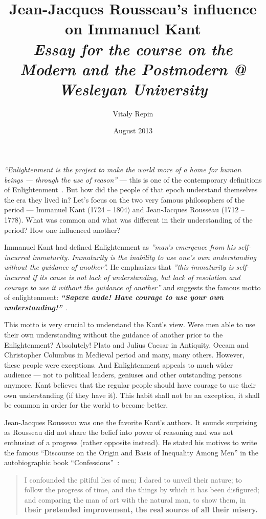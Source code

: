\documentclass{article}
\title{Jean-Jacques Rousseau's influence on Immanuel Kant\\ \textit{\small Essay for the course on the Modern and the Postmodern @ Wesleyan University}}
\author{Vitaly Repin}
\date{August 2013}
\begin{document}
\maketitle

\textit{``Enlightenment is the project to make the world more of a home for human beings --- through the use of reason''} --- this is one of the contemporary definitions of
Enlightenment~\cite{Roth}.
But how did the  people of that epoch understand themselves the era they lived in? Let's focus on the two very famous philosophers of the period --- Immanuel Kant (1724 -- 1804) and
Jean-Jacques Rousseau (1712 -- 1778). What was common and what was different in their understanding of the period? How one influenced another?


Immanuel Kant had defined Enlightenment as \textit{''man's emergence from his self-incurred immaturity. Immaturity is the inability to use one's own understanding without the guidance
of another''.} He emphasizes that \textit{''this immaturity is self-incurred if its cause is not lack of understanding, but lack of resolution and courage to use it without the guidance of another''}
and suggests the famous motto of enlightenment: \textbf{\textit{``Sapere aude! Have courage to use your own understanding!''}}~\cite{Kant}.

This motto is very crucial to understand the Kant's view. Were men able to use their own understanding without the guidance of another prior to the Enlightenment? Absolutely!
Plato and Julius Caesar in Antiquity, Occam and Christopher Columbus in Medieval period and many, many others. However, these people were exceptions. And Enlightenment appeals
to much wider audience --- not to political leaders, geniuses and other outstanding persons anymore. Kant believes that the regular people should have courage to use their
own understanding (if they have it). This habit shall not be an exception, it shall be common in order for the world to become better.

Jean-Jacques Rousseau was one the favorite Kant's authors. It sounds surprising as Rousseau did not share the belief into power of reasoning and was not enthusiast of a progress
(rather opposite instead).
He stated his motives to write the famous ``Discourse on the Origin and Basis of Inequality Among Men'' in the autobiographic book ``Confessions''~\cite{Confessions}:

\begin{quote}
I confounded the pitiful lies
of men; I dared to unveil their nature; to follow the progress of time, and the things by which it has been disfigured; and comparing the man of art with the natural man, to show them, in
\textbf{their pretended improvement, the real source of all their misery.}
\end{quote}
\end{document}
